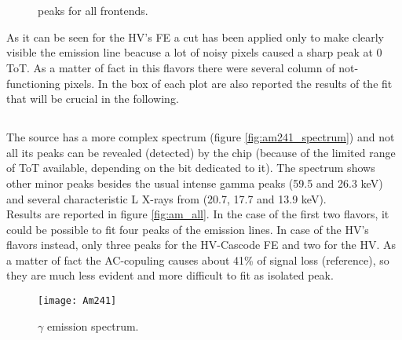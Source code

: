\begin{figure}[h!]
\centering
{}\quad
{}\\
\quad
{}\\
\caption{ peaks for all frontends.}
\label{fig:fe_all}
\end{figure}

As it can be seen for the HV's FE a cut has been applied only to make clearly visible the emission line beacuse a lot of noisy pixels caused a sharp peak at 0 ToT. As a matter of fact in this flavors there were several column of not-functioning pixels. In the box of each plot are also reported the results of the fit that will be crucial in the following.


\subsection{}


The  source has a more complex spectrum (figure \vref{fig:am241_spectrum}) and not all its peaks can be revealed (detected) by the chip (because of the limited range of ToT available, depending on the bit dedicated to it). The spectrum shows other minor peaks besides the usual intense gamma peaks (59.5 and 26.3 keV) and several characteristic L X-rays from  (20.7, 17.7 and 13.9 keV).\\ 
Results are reported in figure \vref{fig:am_all}. In the case of the first two flavors, it could be possible to fit four peaks of the emission lines. In case of the HV's flavors instead, only three peaks for the HV-Cascode FE and two for the HV. As a matter of fact the AC-copuling causes about 41\% of signal loss (reference), so they are much less evident and more difficult to fit as isolated peak.

\begin{figure}[h!]
\centering
\texttt{[image: Am241]}
\caption{ $\gamma$ emission spectrum.}
\label{fig:am241_spectrum}
\end{figure}


